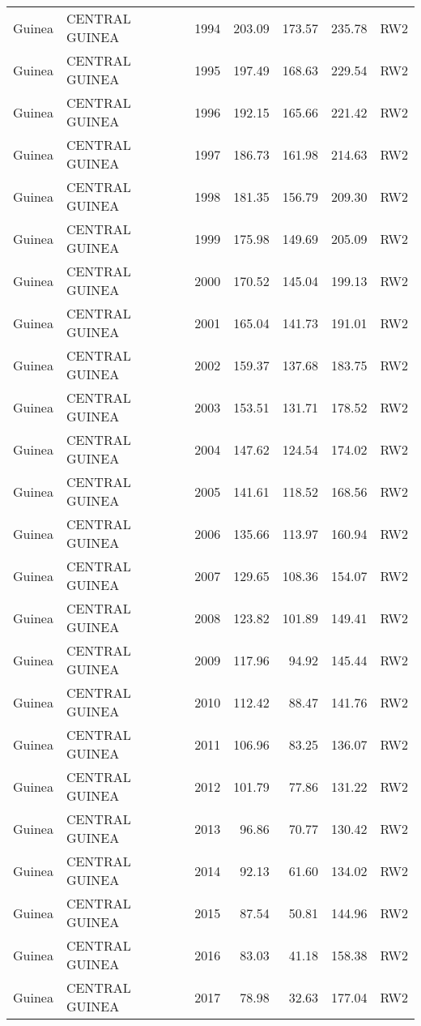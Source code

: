 \begin{longtable}{lllrrrl}
  Guinea & CENTRAL GUINEA & 1994 & 203.09 & 173.57 & 235.78 & RW2 \\ 
  Guinea & CENTRAL GUINEA & 1995 & 197.49 & 168.63 & 229.54 & RW2 \\ 
  Guinea & CENTRAL GUINEA & 1996 & 192.15 & 165.66 & 221.42 & RW2 \\ 
  Guinea & CENTRAL GUINEA & 1997 & 186.73 & 161.98 & 214.63 & RW2 \\ 
  Guinea & CENTRAL GUINEA & 1998 & 181.35 & 156.79 & 209.30 & RW2 \\ 
  Guinea & CENTRAL GUINEA & 1999 & 175.98 & 149.69 & 205.09 & RW2 \\ 
  Guinea & CENTRAL GUINEA & 2000 & 170.52 & 145.04 & 199.13 & RW2 \\ 
  Guinea & CENTRAL GUINEA & 2001 & 165.04 & 141.73 & 191.01 & RW2 \\ 
  Guinea & CENTRAL GUINEA & 2002 & 159.37 & 137.68 & 183.75 & RW2 \\ 
  Guinea & CENTRAL GUINEA & 2003 & 153.51 & 131.71 & 178.52 & RW2 \\ 
  Guinea & CENTRAL GUINEA & 2004 & 147.62 & 124.54 & 174.02 & RW2 \\ 
  Guinea & CENTRAL GUINEA & 2005 & 141.61 & 118.52 & 168.56 & RW2 \\ 
  Guinea & CENTRAL GUINEA & 2006 & 135.66 & 113.97 & 160.94 & RW2 \\ 
  Guinea & CENTRAL GUINEA & 2007 & 129.65 & 108.36 & 154.07 & RW2 \\ 
  Guinea & CENTRAL GUINEA & 2008 & 123.82 & 101.89 & 149.41 & RW2 \\ 
  Guinea & CENTRAL GUINEA & 2009 & 117.96 & 94.92 & 145.44 & RW2 \\ 
  Guinea & CENTRAL GUINEA & 2010 & 112.42 & 88.47 & 141.76 & RW2 \\ 
  Guinea & CENTRAL GUINEA & 2011 & 106.96 & 83.25 & 136.07 & RW2 \\ 
  Guinea & CENTRAL GUINEA & 2012 & 101.79 & 77.86 & 131.22 & RW2 \\ 
  Guinea & CENTRAL GUINEA & 2013 & 96.86 & 70.77 & 130.42 & RW2 \\ 
  Guinea & CENTRAL GUINEA & 2014 & 92.13 & 61.60 & 134.02 & RW2 \\ 
  Guinea & CENTRAL GUINEA & 2015 & 87.54 & 50.81 & 144.96 & RW2 \\ 
  Guinea & CENTRAL GUINEA & 2016 & 83.03 & 41.18 & 158.38 & RW2 \\ 
  Guinea & CENTRAL GUINEA & 2017 & 78.98 & 32.63 & 177.04 & RW2 \\ 

\end{longtable}
